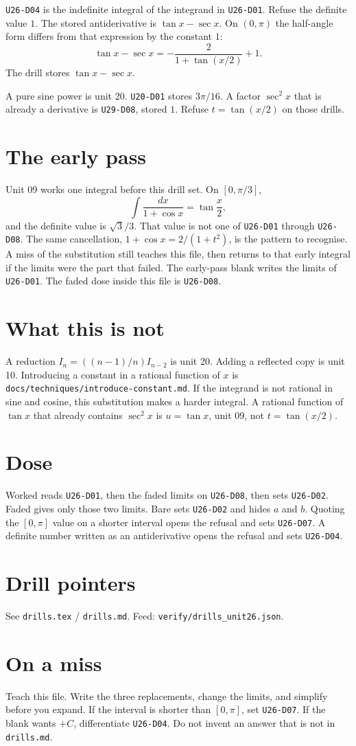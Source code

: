 \texttt{U26-D04} is the indefinite integral of the integrand in \texttt{U26-D01}. Refuse the definite value $1$. The stored antiderivative is $\tan x-\sec x$. On $(0,\pi)$ the half-angle form differs from that expression by the constant $1$:
\[
\tan x-\sec x=-\frac{2}{1+\tan(x/2)}+1.
\]
The drill stores $\tan x-\sec x$.

A pure sine power is unit 20. \texttt{U20-D01} stores $3\pi/16$. A factor $\sec^2 x$ that is already a derivative is \texttt{U29-D08}, stored $1$. Refuse $t=\tan(x/2)$ on those drills.

\section{The early pass}
Unit 09 works one integral before this drill set. On $[0,\pi/3]$,
\[
\int\frac{dx}{1+\cos x}=\tan\frac x2,
\]
and the definite value is $\sqrt{3}/3$. That value is not one of \texttt{U26-D01} through \texttt{U26-D08}. The same cancellation, $1+\cos x=2/(1+t^2)$, is the pattern to recognise. A miss of the substitution still teaches this file, then returns to that early integral if the limits were the part that failed. The early-pass blank writes the limits of \texttt{U26-D01}. The faded dose inside this file is \texttt{U26-D08}.

\section{What this is not}
A reduction $I_n=((n-1)/n)I_{n-2}$ is unit 20. Adding a reflected copy is unit 10. Introducing a constant in a rational function of $x$ is \texttt{docs/techniques/introduce-constant.md}. If the integrand is not rational in sine and cosine, this substitution makes a harder integral. A rational function of $\tan x$ that already contains $\sec^2 x$ is $u=\tan x$, unit 09, not $t=\tan(x/2)$.

\section{Dose}
Worked reads \texttt{U26-D01}, then the faded limits on \texttt{U26-D08}, then sets \texttt{U26-D02}. Faded gives only those two limits. Bare sets \texttt{U26-D02} and hides $a$ and $b$. Quoting the $[0,\pi]$ value on a shorter interval opens the refusal and sets \texttt{U26-D07}. A definite number written as an antiderivative opens the refusal and sets \texttt{U26-D04}.

\section{Drill pointers}
See \texttt{drills.tex} / \texttt{drills.md}. Feed: \texttt{verify/drills\_unit26.json}.

\section*{On a miss}
Teach this file. Write the three replacements, change the limits, and simplify before you expand. If the interval is shorter than $[0,\pi]$, set \texttt{U26-D07}. If the blank wants $+C$, differentiate \texttt{U26-D04}. Do not invent an answer that is not in \texttt{drills.md}.

